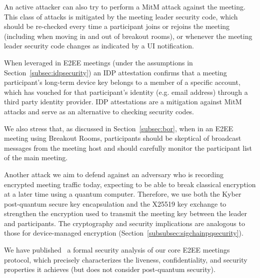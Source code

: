 An active attacker can also try to perform a MitM attack against the meeting. This class of attacks
is mitigated by the meeting leader security code, which should be re-checked every time a
participant joins or rejoins the meeting (including when moving in and out of breakout rooms), or
whenever the meeting leader security code changes as indicated by a UI notification.

When leveraged in E2EE meetings (under the assumptions in Section~\ref{subsec:idpsecurity}) an IDP
attestation confirms that a meeting participant's long-term device key belongs to a member of a specific account, which has vouched for that participant's identity (e.g. email address) through a third party identity provider. IDP attestations are a mitigation against MitM attacks and serve as an alternative to checking security codes.

We also stress that, as discussed in Section~\ref{subsec:bor}, when in an E2EE meeting using Breakout
Rooms, participants should be skeptical of broadcast messages from the meeting host and should
carefully monitor the participant list of the main meeting.

Another attack we aim to defend against an adversary who is recording encrypted meeting traffic
today, expecting to be able to break classical encryption at a later time using a quantum computer.
Therefore, we use both the Kyber post-quantum secure key encapsulation and the X25519 key exchange
to strengthen the encryption used to transmit the meeting key between the leader and participants.
The cryptography and security implications are analogous to those for device-managed encryption
(Section~\ref{subsubsec:sigchainpqsecurity}).

We have published~\cite{eurocrypt-2023-32928} a formal security analysis of our core E2EE meetings protocol,
which precisely characterizes the liveness, confidentiality, and security properties it achieves (but does not consider post-quantum security).

